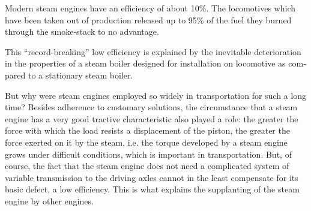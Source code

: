 Modern steam engines have an efficiency of about 10\%. The locomotives which have been taken out of production released up to 95\% of the fuel they burned through the smoke-stack to no advantage.

This ``record-breaking'' low efficiency is explained by the inevitable deterioration in the properties of a steam boiler designed for installation on locomotive as com­pared to a stationary steam boiler.

But why were steam engines employed so widely in transportation for such a long time? Besides adherence to customary solutions, the circumstance that a steam en­gine has a very good tractive characteristic also played a role: the greater the force with which the load resists a displacement of the piston, the greater the force exerted on it by the steam, i.e. the torque developed by a steam engine grows under difficult conditions, which is important in transportation. But, of course, the fact that the steam engine does not need a complicated system of variable transmission to the driving axles cannot in the least compensate for its basic defect, a low efficiency. This is what explains the supplanting of the steam engine by other engines.